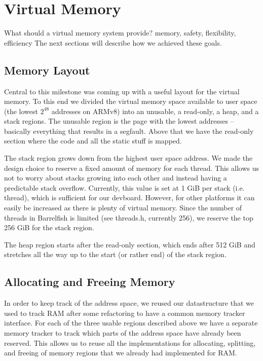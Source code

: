 \chapter{Virtual Memory}

What should a virtual memory system provide? memory, safety, flexibility, efficiency
The next sections will describe how we achieved these goals.

\section{Memory Layout}
Central to this milestone was coming up with a useful layout for the virtual memory. To this end
we divided the virtual memory space available to user space (the lowest $2^{48}$ addresses on ARMv8)
into an unusable, a read-only, a heap, and
a stack regions. The unusable region is the page with the lowest addresses -- basically everything
that results in a segfault. Above that we have the read-only section where the code and all the static stuff %
is mapped.

The stack region grows down from the highest user space address. We made the design
choice to reserve a fixed amount of memory for each thread. This allows us not to worry
about stacks growing into each other and instead having a predictable stack overflow.
Currently, this value is set at 1 GiB per stack (i.e. thread), which is sufficient for our devboard.
However, for other platforms it can easily be increased as there is plenty of virtual memory.
Since the number of threads in Barrelfish is limited (see threads.h, currently 256), we
reserve the top 256 GiB for the stack region.

The heap region starts after the read-only section, which ends after 512 GiB and stretches all the way
up to the start (or rather end) of the stack region.

\section{Allocating and Freeing Memory}
In order to keep track of the address space, we reused our datastructure that we used to track
RAM after some refactoring to have a common memory tracker interface. For each of the three usable
regions described above we have a separate memory tracker to track which parts of the address space
have already been reserved. This allows us to reuse all the implementations for allocating, splitting,
and freeing of memory regions that we already had implemented for RAM.

